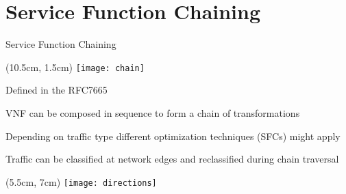 \section{Service Function Chaining}
\begin{frame}{Service Function Chaining}

  \begin{textblock*}{1cm}(10.5cm, 1.5cm)
    \texttt{[image: chain]}
  \end{textblock*}

  Defined in the RFC7665

  \vspace{0.46cm}

  VNF can be composed in sequence to form a chain of transformations

  \vspace{0.46cm}

  Depending on traffic type different optimization techniques (SFCs) might apply

  \vspace{0.46cm}

  Traffic can be classified at network edges and reclassified during chain
  traversal

  \begin{textblock*}{1cm}(5.5cm, 7cm)
    \texttt{[image: directions]}
  \end{textblock*}

\end{frame}